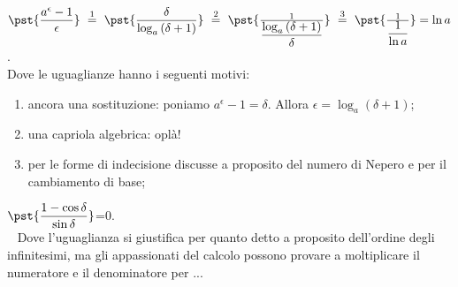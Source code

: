 \begin{esempio}
\(\pst{\dfrac{a^\epsilon-1}{\epsilon}}
~ \stackrel{1}{=} ~  
\pst{\dfrac{\delta}{\log_a{(\delta+1)}}}
~ \stackrel{2}{=} ~
\pst{\frac{1}{\dfrac{\log_a{(\delta+1)}}{\delta}}}
~ \stackrel{3}{=} ~ 
\pst{\frac{1}{\dfrac{1}{\ln{a}}}}=\ln{a}\).\\

Dove le uguaglianze hanno i seguenti motivi:
\begin{enumerate} [nosep]
 \item ancora una sostituzione: poniamo
\(a^\epsilon-1=\delta\). Allora \(\epsilon=\log_a(\delta+1)\);
 \item una capriola algebrica: oplà! 
 \item per le forme di indecisione discusse a proposito del numero di Nepero
e per il cambiamento di base;
\end{enumerate}
\end{esempio}

\begin{esempio}
 \(\pst{\dfrac{1-\cos \delta}{\sin \delta}}\)=0.\\
~
Dove l'uguaglianza si giustifica per quanto detto a proposito dell'ordine 
degli infinitesimi, ma gli appassionati del calcolo possono provare a 
moltiplicare il numeratore e il denominatore per ...
\end{esempio}
